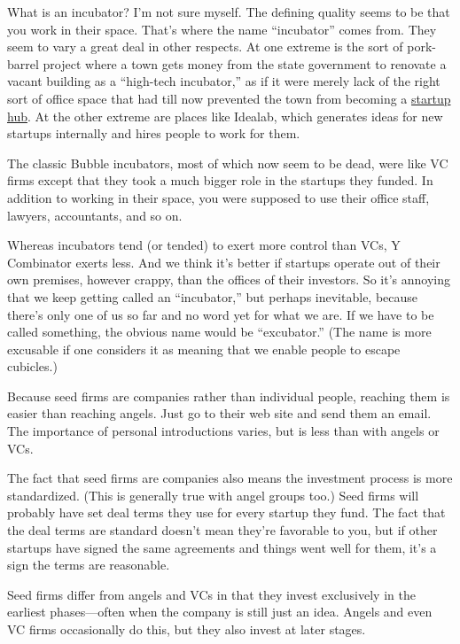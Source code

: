 What is an incubator? I'm not sure myself. The defining quality seems to
be that you work in their space. That's where the name ``incubator''
comes from. They seem to vary a great deal in other respects. At one
extreme is the sort of pork-barrel project where a town gets money from
the state government to renovate a vacant building as a ``high-tech
incubator,'' as if it were merely lack of the right sort of office space
that had till now prevented the town from becoming a
\href{siliconvalley.html}{startup hub}. At the other extreme are places
like Idealab, which generates ideas for new startups internally and
hires people to work for them.

The classic Bubble incubators, most of which now seem to be dead, were
like VC firms except that they took a much bigger role in the startups
they funded. In addition to working in their space, you were supposed to
use their office staff, lawyers, accountants, and so on.

Whereas incubators tend (or tended) to exert more control than VCs, Y
Combinator exerts less. And we think it's better if startups operate out
of their own premises, however crappy, than the offices of their
investors. So it's annoying that we keep getting called an
``incubator,'' but perhaps inevitable, because there's only one of us so
far and no word yet for what we are. If we have to be called something,
the obvious name would be ``excubator.'' (The name is more excusable if
one considers it as meaning that we enable people to escape cubicles.)

Because seed firms are companies rather than individual people, reaching
them is easier than reaching angels. Just go to their web site and send
them an email. The importance of personal introductions varies, but is
less than with angels or VCs.

The fact that seed firms are companies also means the investment process
is more standardized. (This is generally true with angel groups too.)
Seed firms will probably have set deal terms they use for every startup
they fund. The fact that the deal terms are standard doesn't mean
they're favorable to you, but if other startups have signed the same
agreements and things went well for them, it's a sign the terms are
reasonable.

Seed firms differ from angels and VCs in that they invest exclusively in
the earliest phases---often when the company is still just an idea.
Angels and even VC firms occasionally do this, but they also invest at
later stages.

